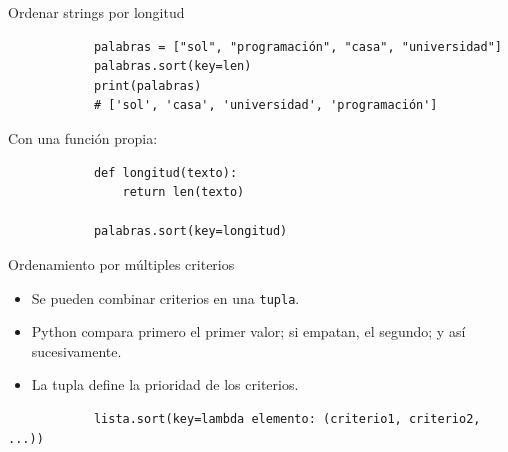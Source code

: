 \documentclass{beamer}
\begin{document}
    \begin{frame}[fragile, t]{Ordenar strings por longitud}
        \begin{verbatim}
            palabras = ["sol", "programación", "casa", "universidad"]
            palabras.sort(key=len)
            print(palabras)
            # ['sol', 'casa', 'universidad', 'programación']
        \end{verbatim}

        \vspace{0.3em}
        Con una función propia:
        \begin{verbatim}
            def longitud(texto):
                return len(texto)

            palabras.sort(key=longitud)
        \end{verbatim}
    \end{frame}

    \begin{frame}[fragile, t]{Ordenamiento por múltiples criterios}
        
        \begin{itemize}
            \item Se pueden combinar criterios en una \texttt{tupla}.
            \item Python compara primero el primer valor; si empatan, el segundo; y así sucesivamente.
            \item La tupla define la prioridad de los criterios.
        \end{itemize}

        \begin{verbatim}
            lista.sort(key=lambda elemento: (criterio1, criterio2, ...))
        \end{verbatim}
    \end{frame}
\end{document}
